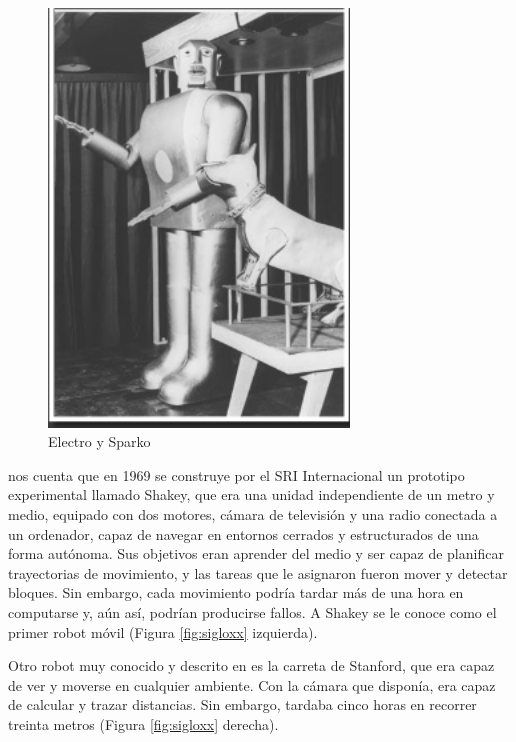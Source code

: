 \begin{figure} [h!]
	\begin{center}
		\includegraphics[width=8cm]{figs/electro-sparko.png}
	\end{center}
	\caption{Electro y Sparko}
	\label{fig:EyS}
\end{figure}


\cite{nilsson1984shakey} nos cuenta que en 1969 se construye por el \ac{SRI} Internacional un prototipo experimental llamado Shakey, que era una unidad independiente de un metro y medio, equipado con dos motores, cámara de televisión y una radio conectada a un ordenador, capaz de navegar en entornos cerrados y estructurados de una forma autónoma. Sus objetivos eran aprender del medio y ser capaz de planificar trayectorias de movimiento, y las tareas que le asignaron fueron mover y detectar bloques. Sin embargo, cada movimiento podría tardar más de una hora en computarse y, aún así, podrían producirse fallos. A Shakey se le conoce como el primer robot móvil (Figura \ref{fig:sigloxx} izquierda). 


Otro robot muy conocido  y descrito en \cite{earnest2012stanfordcart} es la carreta de Stanford, que era capaz de ver y moverse en cualquier ambiente. Con la cámara que disponía, era capaz de calcular y trazar distancias. Sin embargo, tardaba cinco horas en recorrer treinta metros (Figura \ref{fig:sigloxx} derecha). 


